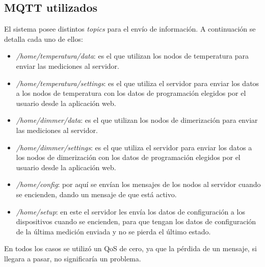 \subsection{\citep{Topics} MQTT utilizados}

El sistema posee distintos \textit{topics} para el envío de información. A continuación se detalla cada uno de ellos:

\begin{itemize}
	\item \textit{/home/temperatura/data}: es el que utilizan los nodos de temperatura para enviar las mediciones al servidor.
	\item \textit{/home/temperatura/settings}: es el que utiliza el servidor para enviar los datos a los nodos de temperatura con los datos de programación elegidos por el usuario desde la aplicación web.
	\item \textit{/home/dimmer/data}: es el que utilizan los nodos de dimerización para enviar las mediciones al servidor.
	\item \textit{/home/dimmer/settings}:  es el que utiliza el servidor para enviar los datos a los nodos de dimerización con los datos de programación elegidos por el usuario desde la aplicación web.
	\item \textit{/home/config}: por aquí se envían los mensajes de los nodos al servidor cuando se encienden, dando un mensaje de que está activo.
	\item \textit{/home/setup}: en este el servidor les envía los datos de configuración a los dispositivos cuando se encienden, para que tengan los datos de configuración de la última medición enviada y no se pierda el último estado.
\end{itemize}

En todos los casos se utilizó un QoS de cero, ya que la pérdida de un mensaje, si llegara a pasar, no significaría un problema.